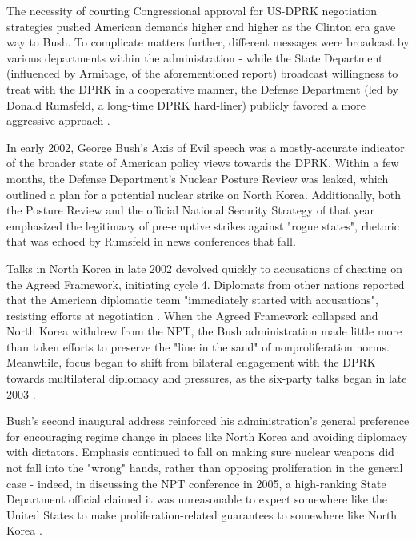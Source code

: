 \documentclass{article}
\begin{document}
The necessity of courting Congressional approval for US-DPRK negotiation strategies pushed American demands higher and higher as the Clinton era gave way to Bush. To complicate matters further, different messages were broadcast by various departments within the administration - while the State Department (influenced by Armitage, of the aforementioned report) broadcast willingness to treat with the DPRK in a cooperative manner, the Defense Department (led by Donald Rumsfeld, a long-time DPRK hard-liner\cite{rumsfeld}) publicly favored a more aggressive approach \cite{harnisch}.

In early 2002, George Bush's Axis of Evil speech was a mostly-accurate indicator of the broader state of American policy views towards the DPRK. Within a few months, the Defense Department's Nuclear Posture Review was leaked, which outlined a plan for a potential nuclear strike on North Korea\cite{npreview}. Additionally, both the Posture Review and the official National Security Strategy of that year emphasized the legitimacy of pre-emptive strikes against "rogue states"\cite{bleiker}, rhetoric that was echoed by Rumsfeld in news conferences that fall\cite{harnisch}.

Talks in North Korea in late 2002 devolved quickly to accusations of cheating on the Agreed Framework, initiating cycle 4. Diplomats from other nations reported that the American diplomatic team "immediately started with accusations", resisting efforts at negotiation \cite{bleiker}. When the Agreed Framework collapsed and North Korea withdrew from the NPT, the Bush administration made little more than token efforts to preserve the "line in the sand" of nonproliferation norms\cite{huntley}. Meanwhile, focus began to shift from bilateral engagement with the DPRK towards multilateral diplomacy and pressures, as the six-party talks began in late 2003 \cite{crs13}.

Bush's second inaugural address reinforced his administration's general preference for encouraging regime change in places like North Korea and avoiding diplomacy with dictators. Emphasis continued to fall on making sure nuclear weapons did not fall into the "wrong" hands, rather than opposing proliferation in the general case - indeed, in discussing the NPT conference in 2005, a high-ranking State Department official claimed it was unreasonable to expect somewhere like the United States to make proliferation-related guarantees to somewhere like North Korea \cite{huntley}.
\end{document}
